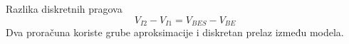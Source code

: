 \begin{frame}[label=10-s020]{Razlika diskretnih pragova}
\setlength{\abovedisplayskip}{4pt}\setlength{\belowdisplayskip}{4pt}\setlength{\abovedisplayshortskip}{3pt}\setlength{\belowdisplayshortskip}{3pt}
\[V_{I2}-V_{I1}=V_{BES}-V_{BE}\]
Dva proračuna koriste grube aproksimacije i diskretan prelaz između modela.\par\medskip
\centering
\end{frame}
